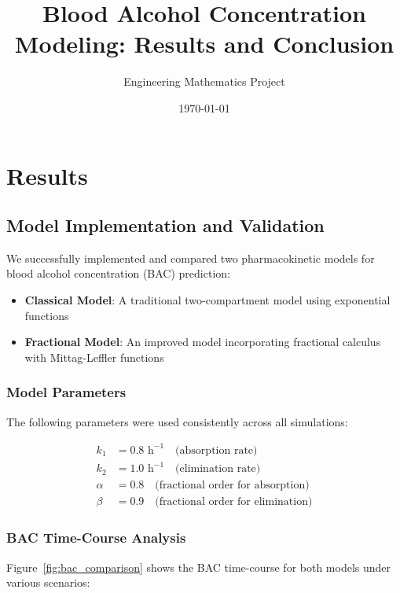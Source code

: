 \documentclass[12pt]{article}
\title{Blood Alcohol Concentration Modeling: Results and Conclusion}
\author{Engineering Mathematics Project}
\date{\today}
\begin{document}
\maketitle

\section{Results}

\subsection{Model Implementation and Validation}

We successfully implemented and compared two pharmacokinetic models for blood alcohol concentration (BAC) prediction:

\begin{itemize}
    \item \textbf{Classical Model}: A traditional two-compartment model using exponential functions
    \item \textbf{Fractional Model}: An improved model incorporating fractional calculus with Mittag-Leffler functions
\end{itemize}

\subsubsection{Model Parameters}

The following parameters were used consistently across all simulations:

\begin{align}
k_1 &= 0.8 \text{ h}^{-1} \quad \text{(absorption rate)} \\
k_2 &= 1.0 \text{ h}^{-1} \quad \text{(elimination rate)} \\
\alpha &= 0.8 \quad \text{(fractional order for absorption)} \\
\beta &= 0.9 \quad \text{(fractional order for elimination)}
\end{align}

\subsubsection{BAC Time-Course Analysis}

Figure~\ref{fig:bac_comparison} shows the BAC time-course for both models under various scenarios:
\end{document}
